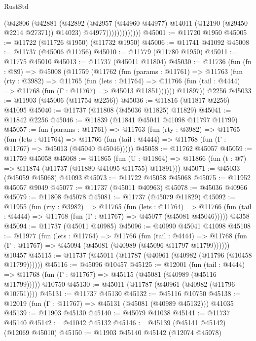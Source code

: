 \begin{lexlean}{RustStd}
\begin{coremodule}
                        (@42806
                          (@42881
                            (@42892
                              (@42957 (@44960 @44977) @14011 (@12190 (@29450 @2214 @27371)) @14023)
                              @44977)))))))))))))
@45001 := @11720 @1950
@45005 := @11722 (@11726 @1950) (@11732 @1950)
@45006 := @11741 @41092
@45008 := @11737 (@45006 @11756)
@45010 := @11779 (@11780 @1950)
@45011 := @11775 @45010
@45013 := @11737 (@45011 @11804)
@45030 := @11736
    (fun (fn : @89) =>
    @45008
      (@11759
        (@11762
          (fun (params : @11761) =>
          @11763
            (fun (rty : @3982) =>
            @11765
              (fun (lets : @11764) =>
              @11766 (fun (tail : @4444) => @11768 (fun (Γ : @11767) => @45013 @11851))))))
        @11897))
    @2256
@45033 := @11903 (@45006 (@11754 @2256))
@45036 := @11816 (@11817 @2256) @41095
@45040 := @11737 (@11808 (@45036 @11825) @11829)
@45041 := @11842 @2256
@45046 := @11839 (@11841 @45041 @41098 @11797 @11799)
@45057 := fun (params : @11761) =>
  @11763
    (fun (rty : @3982) =>
    @11765
      (fun (lets : @11764) =>
      @11766 (fun (tail : @4444) => @11768 (fun (Γ : @11767) => @45013 (@45040 @45046)))))
@45058 := @11762 @45057
@45059 := @11759 @45058
@45068 := @11865
    (fun (U : @11864) => @11866 (fun (t : @7) => @11874 (@11737 (@11880 @41095 @11755) @11891)))
@45071 := @45033 (@45059 @45068) @41093
@45073 := @11722 @45058 @45068
@45075 := @11952 @45057 @9049
@45077 := @11737 (@45011 @40963)
@45078 := @45036 @40966
@45079 := @11808 @45078
@45081 := @11737 (@45079 @11829)
@45092 := @11955
    (fun (rty : @3982) =>
    @11765
      (fun (lets : @11764) =>
      @11766 (fun (tail : @4444) => @11768 (fun (Γ : @11767) => @45077 (@45081 @45046)))))
    @4358
@45094 := @11737 (@45011 @40985)
@45096 := @40990 @45041 @41098
@45108 := @11977
    (fun (lets : @11764) =>
    @11766
      (fun (tail : @4444) =>
      @11768 (fun (Γ : @11767) => @45094 (@45081 (@40989 (@45096 @11797 @11799))))))
    @10457
@45115 := @11737 (@45011 (@11787 (@40961 (@40982 (@11796 (@10458 @11799))))))
@45116 := @45096 @10457
@45125 := @12001
    (fun (tail : @4444) => @11768 (fun (Γ : @11767) => @45115 (@45081 (@40989 (@45116 @11799)))))
    @10750
@45130 := @45011 (@11787 (@40961 (@40982 (@11796 @10751))))
@45131 := @11737 @45130
@45132 := @45116 @10750
@45138 := @12019 (fun (Γ : @11767) => @45131 (@45081 (@40989 @45132))) @41035
@45139 := @11903 @45130
@45140 := @45079 @41038
@45141 := @11737 @45140
@45142 := @41042 @45132
@45146 := @45139 (@45141 @45142) (@12069 @45010)
@45150 := @11903 @45140 @45142 (@12074 @45078)

\end{coremodule}
\end{lexlean}
